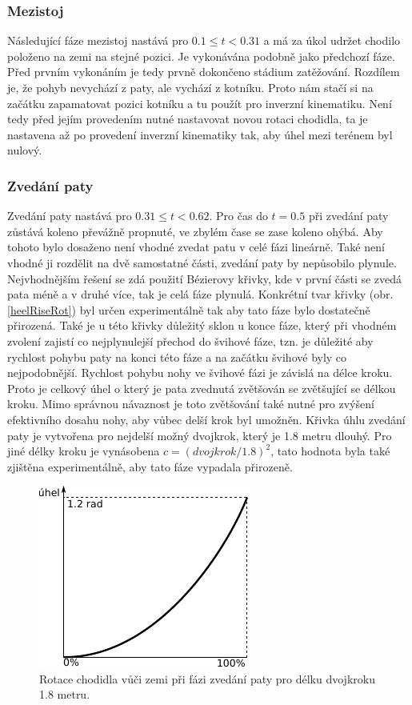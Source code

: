 \subsubsection{Mezistoj}
Následující fáze mezistoj nastává pro $0.1 \leq t < 0.31$ a má za úkol udržet chodilo položeno na zemi na stejné pozici. Je vykonávána podobně jako předchozí fáze. Před prvním vykonáním je tedy prvně dokončeno stádium zatěžování. Rozdílem je, že pohyb nevychází z paty, ale vychází z kotníku. Proto nám stačí si na začátku zapamatovat pozici kotníku a tu použít pro inverzní kinematiku. Není tedy před jejím provedením nutné nastavovat novou rotaci chodidla, ta je nastavena až po provedení inverzní kinematiky tak, aby úhel mezi terénem byl nulový.

\subsubsection{Zvedání paty}
Zvedání paty nastává pro $0.31 \leq t < 0.62$. Pro čas do $t = 0.5$ při zvedání paty zůstává koleno převážně propnuté, ve zbylém čase se zase koleno ohýbá. Aby tohoto bylo dosaženo není vhodné zvedat patu v celé fázi lineárně. Také není vhodné ji rozdělit na dvě samostatné části, zvedání paty by nepůsobilo plynule. Nejvhodnějším řešení se zdá použití Bézierovy křivky, kde v první části se zvedá pata méně a v druhé více, tak je celá fáze plynulá. Konkrétní tvar křivky (obr. \ref{heelRiseRot}) byl určen experimentálně tak aby tato fáze bylo dostatečně přirozená. Také je u této křivky důležitý sklon u konce fáze, který při vhodném zvolení zajistí co nejplynulejší přechod do švihové fáze, tzn. je důležité aby rychlost pohybu paty na konci této fáze a na začátku švihové byly co nejpodobnější. Rychlost pohybu nohy ve švihové fázi je závislá na délce kroku. Proto je celkový úhel o který je pata zvednutá zvětšován se zvětšující se délkou kroku. Mimo správnou návaznost je toto zvětšování také nutné pro zvýšení efektivního dosahu nohy, aby vůbec delší krok byl umožněn. Křivka úhlu zvedání paty je vytvořena pro nejdelší možný dvojkrok, který je 1.8 metru dlouhý. Pro jiné délky kroku je vynásobena $c = (dvojkrok/1.8)^2$, tato hodnota byla také zjištěna experimentálně, aby tato fáze vypadala přirozeně.

\begin{figure}[h]
	\centering
	\includegraphics[width=0.3\linewidth]{fig/heelRiseRot.pdf}
	\caption{Rotace  chodidla vůči zemi při fázi zvedání paty pro délku dvojkroku 1.8 metru.}
	\label{fig:heelRiseRot}
\end{figure}

